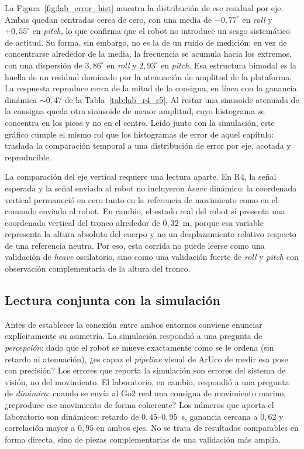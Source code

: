 \documentclass[12pt,a4paper]{report}
\begin{document}
La Figura~\ref{fig:lab_error_hist} muestra la distribución de ese residual por
eje. Ambas quedan centradas cerca de cero, con una media de \(-0{,}77^\circ\) en \emph{roll}
y \(+0{,}55^\circ\) en \emph{pitch}, lo que confirma que el robot no introduce un
sesgo sistemático de actitud. Su forma, sin embargo, no es la de un ruido de
medición: en vez de concentrarse alrededor de la media, la frecuencia se
acumula hacia los extremos, con una dispersión de \(3{,}86^\circ\) en \emph{roll} y
\(2{,}93^\circ\) en \emph{pitch}. Esa estructura bimodal es la huella de un residual
dominado por la atenuación de amplitud de la plataforma. La respuesta reproduce
cerca de la mitad de la consigna, en línea con la ganancia dinámica
\(\sim 0{,}47\) de la Tabla~\ref{tab:lab_r4_r5}. Al restar una sinusoide
atenuada de la consigna queda otra sinusoide de menor amplitud, cuyo histograma
se concentra en los picos y no en el centro. Leído junto con la simulación,
este gráfico cumple el mismo rol que los histogramas de error de aquel
capítulo: traslada la comparación temporal a una distribución de error por eje,
acotada y reproducible.

La comparación del eje vertical requiere una lectura aparte. En R4, la señal
esperada y la señal enviada al robot no incluyeron \emph{heave} dinámico: la
coordenada vertical permaneció en cero tanto en la referencia de movimiento como
en el comando enviado al robot. En
cambio, el estado real del robot sí presenta una coordenada vertical del tronco
alrededor de \(0{,}32\)~m, porque esa variable representa la altura absoluta
del cuerpo y no un desplazamiento relativo respecto de una referencia neutra.
Por eso, esta corrida no puede leerse como una validación de \emph{heave} oscilatorio,
sino como una validación fuerte de \emph{roll} y \emph{pitch} con observación complementaria
de la altura del tronco.

\subsection{Lectura conjunta con la simulación}

Antes de establecer la conexión entre ambos entornos conviene enunciar
explícitamente su asimetría. La simulación respondió a una pregunta de
\emph{percepción}: dado que el robot se mueve exactamente como se le ordena
(sin retardo ni atenuación), ¿es capaz el \textit{pipeline} visual de ArUco de medir esa
pose con precisión? Los errores que reporta la simulación son errores del
sistema de visión, no del movimiento. El laboratorio, en cambio, respondió a
una pregunta de \emph{dinámica}: cuando se envía al Go2 real una consigna de
movimiento marino, ¿reproduce ese movimiento de forma coherente? Los números
que aporta el laboratorio son dinámicos: retardo de \(0{,}45\)--\(0{,}95\)~s,
ganancia cercana a \(0{,}62\) y correlación mayor a \(0{,}95\) en ambos ejes. No
se trata de resultados comparables en forma directa, sino de piezas
complementarias de una validación más amplia.
\end{document}
